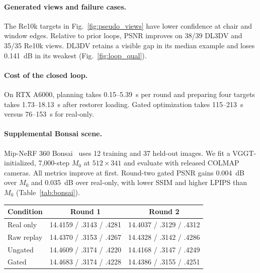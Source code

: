 {\paragraph{Generated views and failure cases.}
The Re10k targets in Fig.~\ref{fig:pseudo_views} have lower confidence at chair and window edges. Relative to prior loops, PSNR improves on 38/39 DL3DV and 35/35 Re10k views. DL3DV retains a visible gap in its median example and loses 0.141~dB in its weakest (Fig.~\ref{fig:loop_qual}).

\paragraph{Cost of the closed loop.}
On RTX A6000, planning takes 0.15--5.39~s per round and preparing four targets takes 1.73--18.13~s after restorer loading. Gated optimization takes 115--213~s versus 76--153~s for real-only.

\paragraph{Supplemental Bonsai scene.}
Mip-NeRF 360 Bonsai~\cite{barron2022mipnerf360} uses 12 training and 37 held-out images. We fit a VGGT-initialized, 7,000-step $M_0$ at $512\times341$ and evaluate with released COLMAP cameras. All metrics improve at first. Round-two gated PSNR gains 0.004~dB over $M_0$ and 0.035~dB over real-only, with lower SSIM and higher LPIPS than $M_0$ (Table~\ref{tab:bonsai}).

\noindent\begin{minipage}{\columnwidth}
  \centering\footnotesize
  \setlength{\tabcolsep}{2.5pt}
  \begin{tabular}{@{}lcc@{}}
    \toprule
    Condition & Round 1 & Round 2 \\
    \midrule
    Real only & 14.4159 / .3143 / .4281 & 14.4037 / .3129 / .4312 \\
    Raw replay & 14.4370 / .3153 / .4267 & 14.4328 / .3142 / .4286 \\
    Ungated & 14.4609 / .3174 / .4220 & 14.4168 / .3147 / .4249 \\
    Gated & 14.4683 / .3174 / .4228 & 14.4386 / .3155 / .4251 \\
    \bottomrule
  \end{tabular}
  \label{tab:bonsai}
\end{minipage}
}
